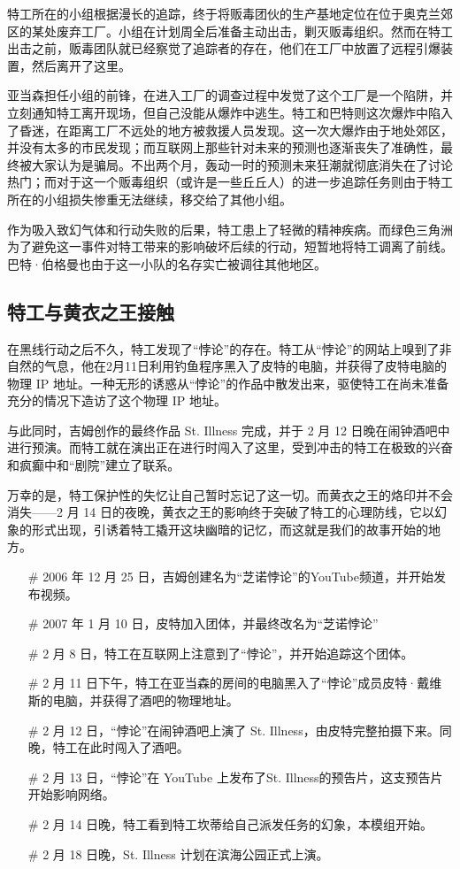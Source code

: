 特工所在的小组根据漫长的追踪，终于将贩毒团伙的生产基地定位在位于奥克兰郊区的某处废弃工厂。小组在计划周全后准备主动出击，剿灭贩毒组织。然而在特工出击之前，贩毒团队就已经察觉了追踪者的存在，他们在工厂中放置了远程引爆装置，然后离开了这里。

亚当森担任小组的前锋，在进入工厂的调查过程中发觉了这个工厂是一个陷阱，并立刻通知特工离开现场，但自己没能从爆炸中逃生。特工和巴特则这次爆炸中陷入了昏迷，在距离工厂不远处的地方被救援人员发现。这一次大爆炸由于地处郊区，并没有太多的市民发现；而互联网上那些针对未来的预测也逐渐丧失了准确性，最终被大家认为是骗局。不出两个月，轰动一时的预测未来狂潮就彻底消失在了讨论热门；而对于这一个贩毒组织（或许是一些丘丘人）的进一步追踪任务则由于特工所在的小组损失惨重无法继续，移交给了其他小组。

作为吸入致幻气体和行动失败的后果，特工患上了轻微的精神疾病。而绿色三角洲为了避免这一事件对特工带来的影响破坏后续的行动，短暂地将特工调离了前线。巴特·伯格曼也由于这一小队的名存实亡被调往其他地区。

\subsection{特工与黄衣之王接触}

在黑线行动之后不久，特工发现了“悖论”的存在。特工从“悖论”的网站上嗅到了非自然的气息，他在2月11日利用钓鱼程序黑入了皮特的电脑，并获得了皮特电脑的物理 IP 地址。一种无形的诱惑从“悖论”的作品中散发出来，驱使特工在尚未准备充分的情况下造访了这个物理 IP 地址。

与此同时，吉姆创作的最终作品 St. Illness 完成，并于 2 月 12 日晚在闹钟酒吧中进行预演。而特工就在演出正在进行时闯入了这里，受到冲击的特工在极致的兴奋和疯癫中和“剧院”建立了联系。

万幸的是，特工保护性的失忆让自己暂时忘记了这一切。而黄衣之王的烙印并不会消失——2 月 14 日的夜晚，黄衣之王的影响终于突破了特工的心理防线，它以幻象的形式出现，引诱着特工撬开这块幽暗的记忆，而这就是我们的故事开始的地方。

\begin{itemize}
    \item[\#] 2006 年 12 月 25 日，吉姆创建名为“芝诺悖论”的YouTube频道，并开始发布视频。
    \item[\#] 2007 年 1 月 10 日，皮特加入团体，并最终改名为“芝诺悖论”
    \item[\#] 2 月 8 日，特工在互联网上注意到了“悖论”，并开始追踪这个团体。
    \item[\#] 2 月 11 日下午，特工在亚当森的房间的电脑黑入了“悖论”成员皮特·戴维斯的电脑，并获得了酒吧的物理地址。
    \item[\#] 2 月 12 日，“悖论”在闹钟酒吧上演了 St. Illness，由皮特完整拍摄下来。同晚，特工在此时闯入了酒吧。
    \item[\#] 2 月 13 日，“悖论”在 YouTube 上发布了St. Illness的预告片，这支预告片开始影响网络。
    \item[\#] 2 月 14 日晚，特工看到特工坎蒂给自己派发任务的幻象，本模组开始。
    \item[\#] 2 月 18 日晚，St. Illness 计划在滨海公园正式上演。
\end{itemize}

